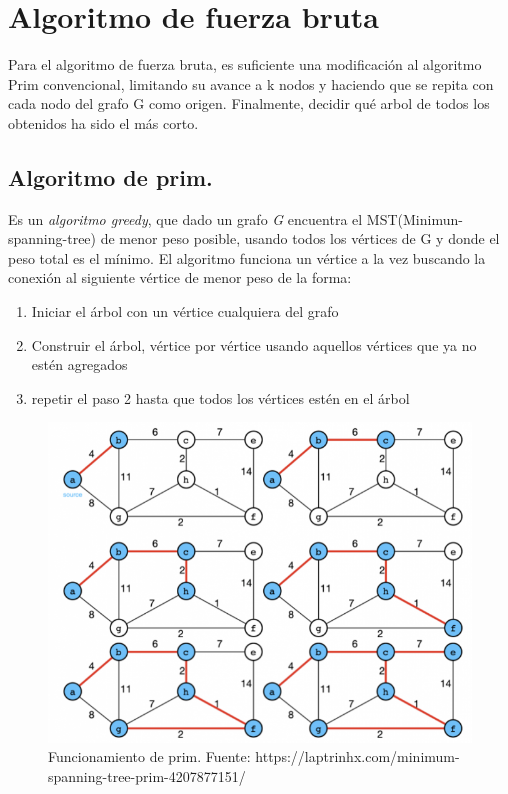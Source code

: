 \documentclass[spanish,12pt]{elsarticle}
\begin{document}
 
\section{Algoritmo de fuerza bruta}
Para el algoritmo de fuerza bruta, es suficiente una modificación al algoritmo Prim convencional, limitando su avance a k nodos y haciendo que se repita con cada nodo del grafo G como origen. Finalmente, decidir qué arbol de todos los obtenidos ha sido el más corto.

\subsection{Algoritmo de prim.}
Es un \textit{algoritmo greedy}, que dado un grafo \textit{G}  encuentra el MST(Minimun-spanning-tree) de menor peso posible, usando todos los vértices de G y donde el peso total es el mínimo. El algoritmo funciona un vértice a la vez buscando la conexión al siguiente vértice de menor peso de la forma:\\
\begin{enumerate}
    \item  Iniciar el árbol con un vértice cualquiera del grafo
    \item  Construir el árbol, vértice por vértice usando aquellos vértices que ya no estén agregados
    \item repetir el paso 2 hasta que todos los vértices estén en el árbol

\end{enumerate}

\begin{figure}[h]
    \centering
    \includegraphics[scale=0.5]{images/prm.png}
    \caption{Funcionamiento de prim. Fuente: https://laptrinhx.com/minimum-spanning-tree-prim-4207877151/ }
    \label{fig:my_label}
\end{figure}
\clearpage
\end{document}
